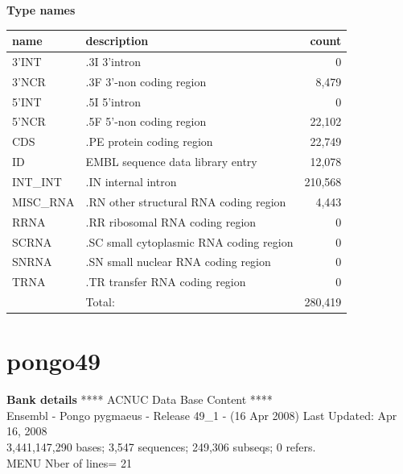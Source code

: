 \documentclass{article}
\begin{document}
\begin{Schunk}
\textbf{Type names}
\noindent\begin{tabular}{llr}
\hline \hline
name & description & count \\
\hline
3'INT  &  .3I 3'intron  &  0 \\
3'NCR  &  .3F  3'-non coding region  &  8,479 \\
5'INT  &  .5I 5'intron  &  0 \\
5'NCR  &  .5F  5'-non coding region  &  22,102 \\
CDS  &  .PE protein coding region  &  22,749 \\
ID  &  EMBL sequence data library entry  &  12,078 \\
INT\_INT  &  .IN  internal intron  &  210,568 \\
MISC\_RNA  &  .RN other structural RNA coding region  &  4,443 \\
RRNA  &  .RR ribosomal RNA coding region  &  0 \\
SCRNA  &  .SC small cytoplasmic RNA coding region  &  0 \\
SNRNA  &  .SN small nuclear RNA coding region  &  0 \\
TRNA  &  .TR transfer RNA coding region  &  0 \\
\hline
 & Total: & 280,419 \\
\hline \hline
\end{tabular}

\section{ pongo49 }
\textbf{Bank details}
             ****     ACNUC Data Base Content      ****                         \\
Ensembl - Pongo pygmaeus - Release 49\_1 - (16 Apr 2008) Last Updated: Apr 16, 2008\\
3,441,147,290 bases; 3,547 sequences; 249,306 subseqs; 0 refers.\\
MENU Nber of lines= 21                                                         


\end{Schunk}
\end{document}
